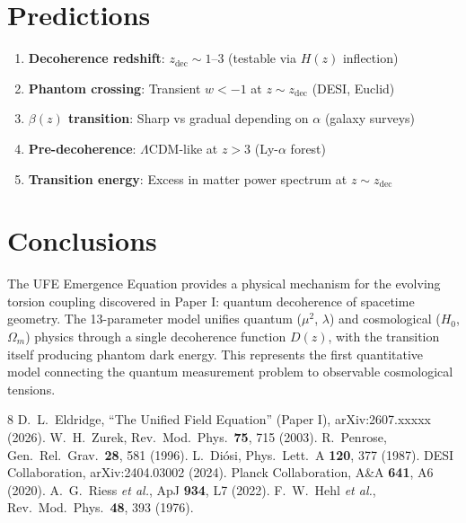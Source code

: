 \documentclass[twocolumn,prd,superscriptaddress,nofootinbib]{revtex4-2}
\begin{document}
\section{Predictions}

\begin{enumerate}
\item \textbf{Decoherence redshift}: $z_\text{dec} \sim 1$--$3$ (testable via $H(z)$ inflection)
\item \textbf{Phantom crossing}: Transient $w < -1$ at $z \sim z_\text{dec}$ (DESI, Euclid)
\item \textbf{$\beta(z)$ transition}: Sharp vs gradual depending on $\alpha$ (galaxy surveys)
\item \textbf{Pre-decoherence}: $\Lambda$CDM-like at $z > 3$ (Ly-$\alpha$ forest)
\item \textbf{Transition energy}: Excess in matter power spectrum at $z \sim z_\text{dec}$
\end{enumerate}

\section{Conclusions}

The UFE Emergence Equation provides a physical mechanism for the evolving torsion coupling discovered in Paper I: quantum decoherence of spacetime geometry. The 13-parameter model unifies quantum ($\mu^2$, $\lambda$) and cosmological ($H_0$, $\Omega_m$) physics through a single decoherence function $D(z)$, with the transition itself producing phantom dark energy. This represents the first quantitative model connecting the quantum measurement problem to observable cosmological tensions.

\begin{thebibliography}{8}
 D.~L.~Eldridge, ``The Unified Field Equation'' (Paper I), arXiv:2607.xxxxx (2026).
 W.~H.~Zurek, Rev.\ Mod.\ Phys.\ \textbf{75}, 715 (2003).
 R.~Penrose, Gen.\ Rel.\ Grav.\ \textbf{28}, 581 (1996).
 L.~Di\'osi, Phys.\ Lett.\ A \textbf{120}, 377 (1987).
 DESI Collaboration, arXiv:2404.03002 (2024).
 Planck Collaboration, A\&A \textbf{641}, A6 (2020).
 A.~G.~Riess \textit{et al.}, ApJ \textbf{934}, L7 (2022).
 F.~W.~Hehl \textit{et al.}, Rev.\ Mod.\ Phys.\ \textbf{48}, 393 (1976).
\end{thebibliography}
\end{document}

